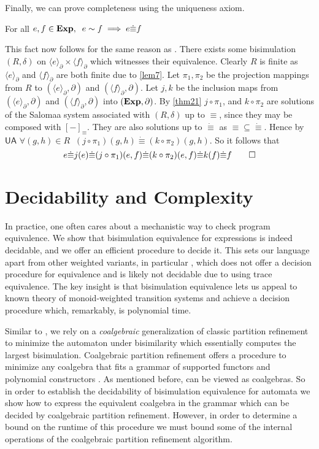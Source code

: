 \documentclass[a4paper,UKenglish,cleveref, autoref, thm-restate]{lipics-v2021}
\newcommand{\Exp}{\textbf{\upshape{Exp}}}
\newcommand{\Ax}[1]{\ensuremath{\mathsf{#1}}}
\newcommand{\wgkat}{\textsf{\upshape{wGKAT}}\xspace}
\newcommand{\probgkat}{\textsf{\upshape{ProbGKAT}}\xspace}
\newcommand{\kat}{\textsf{\upshape{KAT}}\xspace}
\newcommand{\kawt}{\textsf{\upshape{KAWT}}\xspace}
\theoremstyle{plain}\newtheoremrep{thm}{Theorem}[section]
\begin{document}
	Finally, we can prove completeness using the uniqueness axiom.
	
	\begin{thmrep}[Completeness]
		For all $e,f \in \Exp,\;\; e \sim f\implies e \dot\equiv f$
	\end{thmrep}
	\begin{appendixproof}
		This fact now follows for the same reason as \probgkat \cite{rozowski2023probabilistic}.
		There exists some bisimulation $(R, \delta)$ on $\langle e\rangle_\partial \times \langle f \rangle_\partial$ which witnesses their equivalence. Clearly $R$ is finite as $\langle e\rangle_\partial$ and $\langle f\rangle_\partial$ are both finite due to \ref{lem7}. Let $\pi_1, \pi_2$ be the projection mappings from $R$ to $(\langle e\rangle_\partial, \partial)$ and $(\langle f\rangle_\partial, \partial)$. Let $j, k$ be the inclusion maps from $(\langle e\rangle_\partial, \partial)$ and $(\langle f\rangle_\partial, \partial)$ into $(\Exp, \partial)$. By \cref{thm21} $j \circ \pi_1$, and $k \circ \pi_2$ are solutions of the Salomaa system associated with $(R, \delta)$ up to $\equiv$, since they may be composed with $[-]_\equiv$. They are also solutions up to $\dot\equiv$ as $\equiv \subseteq \dot\equiv$. Hence by \Ax{UA} $\forall (g,h) \in R \;\;(j\circ \pi_1)(g,h) \dot\equiv (k \circ \pi_2)(g,h)$. So it follows that
		$$e \dot\equiv j(e)\dot\equiv (j\circ \pi_1)(e,f) \dot\equiv (k\circ \pi_2)(e,f) \dot\equiv k(f) \dot\equiv f\qedhere$$
	\end{appendixproof}
	\section{Decidability and Complexity}\label{decisionS}
	In practice, one often cares about a mechanistic way to check program equivalence. We show that bisimulation equivalence for \wgkat expressions is indeed decidable, and we offer an efficient procedure to decide it. This sets our language apart from other weighted \kat variants, in particular \kawt, which does not offer a decision procedure for equivalence and is likely not decidable due to using trace equivalence. The key insight is that bisimulation equivalence lets us appeal to known theory of monoid-weighted transition systems and achieve a decision procedure which, remarkably, is polynomial time.
	
	Similar to \probgkat \cite{rozowski2023probabilistic}, we rely on a \emph{coalgebraic} generalization \cite{10.1007/978-3-030-30942-8_18} of classic partition refinement \cite{KanPartRefine, partrefine} to minimize the automaton under bisimilarity which essentially computes the largest bisimulation.  
	Coalgebraic partition refinement offers a procedure to minimize any coalgebra that fits a grammar of supported functors and polynomial constructors \cite{10.1007/978-3-030-30942-8_18}. As mentioned before, \wgkat can be viewed as coalgebras. So in order to establish the decidability of bisimulation equivalence for \wgkat automata we show how to express the equivalent coalgebra in the grammar which can be decided by coalgebraic partition refinement. However, in order to determine a bound on the runtime of this procedure we must bound some of the internal operations of the coalgebraic partition refinement algorithm. 
	
\end{document}
